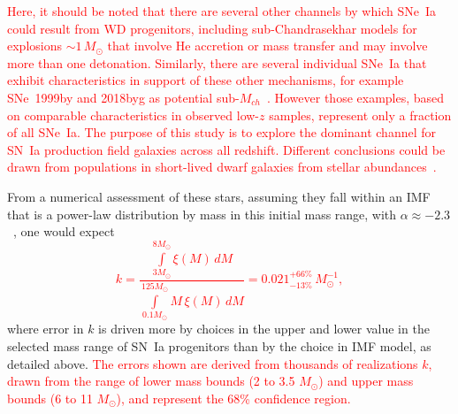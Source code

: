 \documentclass[apj, linenumbers]{aastex62}
\begin{document}
\textcolor{red}{Here, it should be noted that there are several other channels by which SNe~Ia could result from WD progenitors, including sub-Chandrasekhar models for explosions $\sim1\,M_{\odot}$ that involve He accretion or mass transfer and may involve more than one detonation. Similarly, there are several individual SNe~Ia that exhibit characteristics in support of these other mechanisms, for example SNe~1999by and 2018byg as potential sub-$M_{ch}$~\citep{Blondin:2018wn,De:2019rv}. However those examples, based on comparable characteristics in observed low-$z$ samples, represent only a fraction of all SNe~Ia. The purpose of this study is to explore the dominant channel for SN~Ia production field galaxies across all redshift. Different conclusions could be drawn from populations in short-lived dwarf galaxies from stellar abundances~\citep{Kirby:2019aa}.}

From a numerical assessment of these stars, assuming they fall within an IMF that is a power-law distribution by mass in this initial mass range, with $\alpha\approx-2.3$~\citep{Salpeter:1955rw,Kroupa:2001gf}, one would expect \textcolor{red}{ 
\begin{equation}
k = \frac{\int\limits_{3M_{\odot}}^{8M_{\odot}} \xi(M)\,dM}{\int\limits_{0.1M_{\odot}}^{125M_{\odot}} M\,\xi(M)\,dM}= 0.021^{+66\%}_{-13\%}\,M_{\odot}^{-1},
\end{equation}}
\noindent where error in $k$ is driven more by choices in the upper and lower value in the selected mass range of SN~Ia progenitors than by the choice in IMF model, as detailed above. \textcolor{red}{The errors shown are derived from thousands of realizations $k$, drawn from the range of lower mass bounds (2 to 3.5 $M_{\odot}$) and upper mass bounds (6 to 11 $M_{\odot}$), and represent the 68\% confidence region.} 
\end{document}
